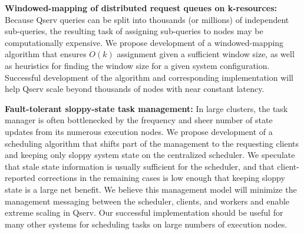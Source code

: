 \documentclass[DM,lsstdraft,toc]{lsstdoc}
\begin{document}
\textbf{Windowed-mapping of distributed request queues on k-resources:}
Because Qserv queries can be split into thousands (or millions) of
independent sub-queries, the resulting task of assigning sub-queries to
nodes may be computationally expensive. We propose development of a
windowed-mapping algorithm that ensures \(O(k)\) assignment given a
sufficient window size, as well as heuristics for finding the window
size for a given system configuration. Successful development of the
algorithm and corresponding implementation will help Qserv scale beyond
thousands of nodes with near constant latency.

\textbf{Fault-tolerant sloppy-state task management:} In large clusters,
the task manager is often bottlenecked by the frequency and sheer number
of state updates from its numerous execution nodes. We propose
development of a scheduling algorithm that shifts part of the management
to the requesting clients and keeping only sloppy system state on the
centralized scheduler. We speculate that stale state information is
usually sufficient for the scheduler, and that client-reported
corrections in the remaining cases is low enough that keeping sloppy
state is a large net benefit. We believe this management model will
minimize the management messaging between the scheduler, clients, and
workers and enable extreme scaling in Qserv. Our successful
implementation should be useful for many other systems for scheduling
tasks on large numbers of execution nodes.
\end{document}
